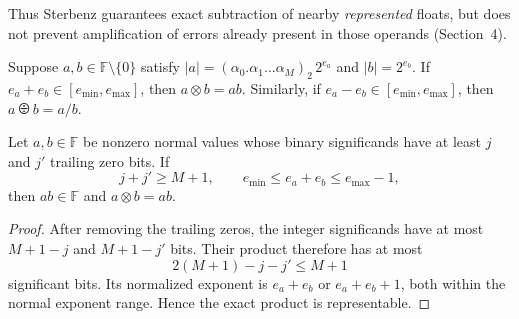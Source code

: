 Thus Sterbenz guarantees exact subtraction of nearby
\emph{represented} floats, but does not prevent amplification
of errors already present in those operands (Section~4).

\begin{proposition}
Suppose $a, b\in\mathbb F\setminus\{0\}$ satisfy
$|a|=(\alpha_0.\alpha_1\dots\alpha_M)_2\, 2^{e_a}$
and $|b|=2^{e_b}$. If
$e_a+e_b\in[e_{\min}, e_{\max}]$, then $a\otimes b=ab$.
Similarly, if $e_a-e_b\in[e_{\min}, e_{\max}]$,
then $a\odiv b=a/b$.
\end{proposition}

\begin{proposition}
Let $a, b\in\mathbb F$ be nonzero normal values whose
binary significands have at least $j$ and $j'$ trailing
zero bits. If
\[
 j+j'\ge M+1, \qquad
 e_{\min}\le e_a+e_b\le e_{\max}-1,
\]
then $ab\in\mathbb F$ and $a\otimes b=ab$.
\end{proposition}
\begin{proof}
After removing the trailing zeros, the integer significands
have at most $M+1-j$ and $M+1-j'$ bits. Their product
therefore has at most
\[
 2(M+1)-j-j'\le M+1
\]
significant bits. Its normalized exponent is
$e_a+e_b$ or $e_a+e_b+1$, both within the normal exponent
range. Hence the exact product is representable.
\end{proof}

